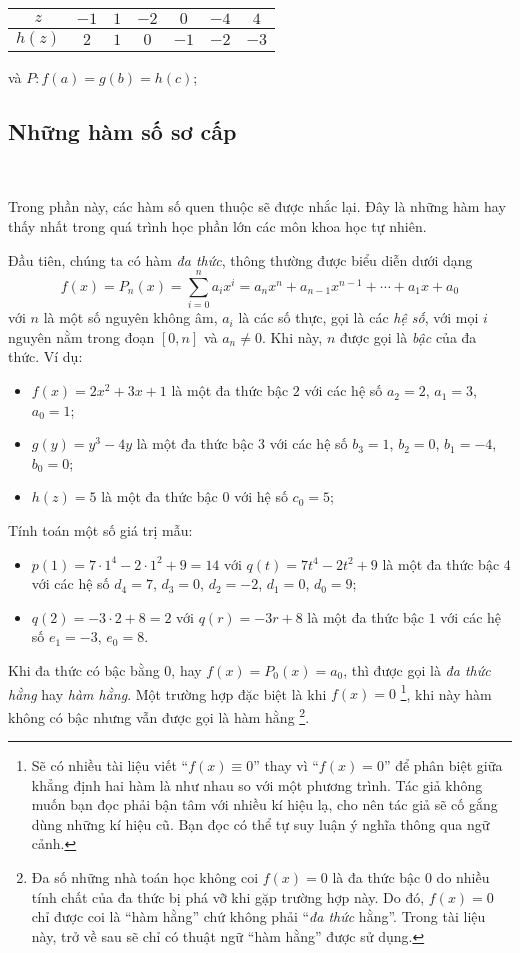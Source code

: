 \documentclass[a4paper, titlepage, openany]{book}
\newcounter{solution}
\newcommand\dblquote[1]{\textquotedblleft #1\textquotedblright}
\begin{document}
\begin{enumerate}
   \noindent\begin{tabular}{|c|c|c|c|c|c|c|}
      \hline
      $z$ & $-1$ & $1$ & $-2$ & $0$ & $-4$ & $4$\\
      \hline
      $h(z)$ & $2$ & $1$ & $0$ & $-1$ & $-2$ & $-3$\\
      \hline
   \end{tabular} và $P:f(a) = g(b) = h(c)$;
\end{enumerate}

\solution[ex:hpt1]

\subsection{Những hàm số sơ cấp}

\ %

Trong phần này, các hàm số quen thuộc sẽ được nhắc lại. Đây là những hàm hay thấy nhất trong quá trình học phần lớn các môn khoa học tự nhiên.

Đầu tiên, chúng ta có hàm \emph{đa thức}, thông thường được biểu diễn dưới dạng $$f(x)=P_n(x)=\sum_{i = 0}^n a_i x^i = a_nx^n + a_{n-1}x^{n-1} + \cdots + a_1x + a_0$$ với $n$ là một số nguyên không âm, $a_i$ là các số thực, gọi là các \emph{hệ số}, với mọi $i$ nguyên nằm trong đoạn $[0, n]$ và $a_n \neq 0$. Khi này, $n$ được gọi là \emph{bậc} của đa thức. Ví dụ:
\begin{itemize}
   \item $f(x) = 2x^2 + 3x + 1$ là một đa thức bậc $2$ với các hệ số $a_2 = 2$, $a_1 = 3$, $a_0 = 1$;
   \item $g(y) = y^3 - 4y$ là một đa thức bậc $3$ với các hệ số $b_3 = 1$, $b_2 = 0$, $b_1 = -4$, $b_0 = 0$;
   \item $h(z) = 5$ là một đa thức bậc $0$ với hệ số $c_0 = 5$;
\end{itemize}
Tính toán một số giá trị mẫu:
\begin{itemize}
   \item $p(1) = 7 \cdot 1^4 - 2 \cdot 1^2 + 9 = 14$ với $q(t)= 7t^4 - 2t^2 + 9$ là một đa thức bậc $4$ với các hệ số $d_4 = 7$, $d_3 = 0$, $d_2 = -2$, $d_1 = 0$, $d_0 = 9$;
   \item $q(2) = -3 \cdot 2 + 8 = 2$ với $q(r) = -3r + 8$ là một đa thức bậc $1$ với các hệ số $e_1 = -3$, $e_0 = 8$.
\end{itemize}
Khi đa thức có bậc bằng $0$, hay $f(x) = P_0(x) = a_0$, thì được gọi là \emph{đa thức hằng} hay \emph{hàm hằng}. Một trường hợp đặc biệt là khi $f(x) = 0$ \footnote{Sẽ có nhiều tài liệu viết \dblquote{$f(x) \equiv 0$} thay vì \dblquote{$f(x) = 0$} để phân biệt giữa khẳng định hai hàm là như nhau so với một phương trình. Tác giả không muốn bạn đọc phải bận tâm với nhiều kí hiệu lạ, cho nên tác giả sẽ cố gắng dùng những kí hiệu cũ. Bạn đọc có thể tự suy luận ý nghĩa thông qua ngữ cảnh.}, khi này hàm không có bậc nhưng vẫn được gọi là hàm hằng \footnote{Đa số những nhà toán học không coi $f(x) = 0$ là đa thức bậc $0$ do nhiều tính chất của đa thức bị phá vỡ khi gặp trường hợp này. Do đó, $f(x) = 0$ chỉ được coi là \dblquote{hàm hằng} chứ không phải \dblquote{\textit{đa thức} hằng}. Trong tài liệu này, trở về sau sẽ chỉ có thuật ngữ \dblquote{hàm hằng} được sử dụng.}.
\end{document}
